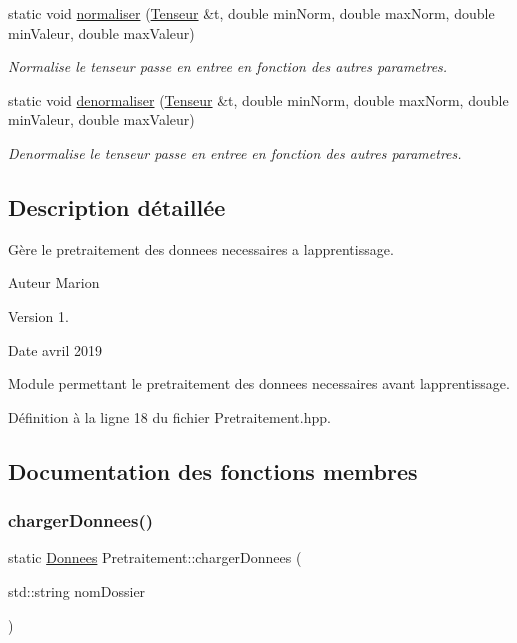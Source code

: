 \begin{DoxyCompactItemize}
static void \hyperlink{class_pretraitement_a3d7be2ef2f1c6b0b8e3f1898110740bc}{normaliser} (\hyperlink{class_tenseur}{Tenseur} \&t, double min\+Norm, double max\+Norm, double min\+Valeur, double max\+Valeur)
\begin{DoxyCompactList}\small\item\em Normalise le tenseur passe en entree en fonction des autres parametres. \end{DoxyCompactList}\item 
static void \hyperlink{class_pretraitement_a68c5f7dc52d76fe0ff1f2794c4de40d7}{denormaliser} (\hyperlink{class_tenseur}{Tenseur} \&t, double min\+Norm, double max\+Norm, double min\+Valeur, double max\+Valeur)
\begin{DoxyCompactList}\small\item\em Denormalise le tenseur passe en entree en fonction des autres parametres. \end{DoxyCompactList}\end{DoxyCompactItemize}


\subsection{Description détaillée}
Gère le pretraitement des donnees necessaires a l\textquotesingle{}apprentissage. 

\begin{DoxyAuthor}{Auteur}
Marion 
\end{DoxyAuthor}
\begin{DoxyVersion}{Version}
1. 
\end{DoxyVersion}
\begin{DoxyDate}{Date}
avril 2019
\end{DoxyDate}
Module permettant le pretraitement des donnees necessaires avant l\textquotesingle{}apprentissage. 

Définition à la ligne 18 du fichier Pretraitement.\+hpp.



\subsection{Documentation des fonctions membres}
\mbox{\label{class_pretraitement_a5f53fc5ecf4893d40577aceb269e97b5}} 
\subsubsection{\texorpdfstring{charger\+Donnees()}{chargerDonnees()}}
{\footnotesize\ttfamily static \hyperlink{class_donnees}{Donnees} Pretraitement\+::charger\+Donnees (\begin{DoxyParamCaption}\item[{std\+::string}]{nom\+Dossier }\end{DoxyParamCaption})\hspace{0.3cm}{\ttfamily [static]}}



